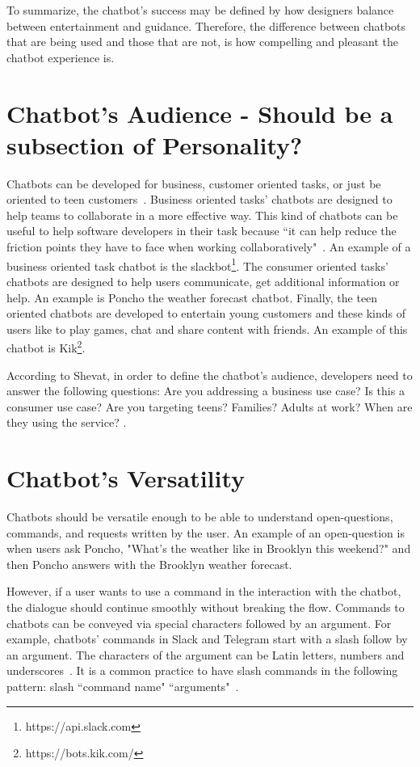 \documentclass[a4paper,10pt]{article}
\begin{document}
To summarize, the chatbot’s success may be defined by how designers balance between entertainment and guidance. Therefore, the difference between chatbots that are being used and those that are not, is how compelling and pleasant the chatbot experience is.

\section{Chatbot's Audience - Should be a subsection of Personality?}

Chatbots can be developed for business, customer oriented tasks, or just be oriented to teen customers~\cite{Shevat2017}. Business oriented tasks' chatbots are designed to help teams to collaborate in a more effective way. This kind of chatbots can be useful to help software developers in their task because ``it can help reduce the friction points they have to face when working collaboratively"~\cite{lebeuf2017software}. An example of a business oriented task chatbot is the slackbot\footnote{https://api.slack.com}. The consumer oriented tasks' chatbots are designed to help users communicate, get additional information or help. An example is Poncho the weather forecast chatbot. Finally, the teen oriented chatbots are developed to entertain young customers and these kinds of users like to play games, chat and share content with friends. An example of this chatbot is Kik\footnote{https://bots.kik.com/}. 

According to Shevat, in order to define the chatbot's audience, developers need to answer the following questions: Are you addressing a business use case? Is this a consumer use case? Are you targeting teens? Families? Adults at work? When are they using the service? \cite{Shevat2017}.

\section{Chatbot's Versatility}
Chatbots should be versatile enough to be able to understand open-questions, commands, and requests written by the user. An example of an open-question is when users ask Poncho, "What's the weather like in Brooklyn this weekend?" and then Poncho answers with the Brooklyn weather forecast. 

However, if a user wants to use a command in the interaction with the chatbot, the dialogue should continue smoothly without breaking the flow. Commands to chatbots can be conveyed via special characters followed by an argument. For example, chatbots' commands in Slack and Telegram start with a slash follow by an argument. The characters of the argument can be Latin letters, numbers and underscores~\cite{botfather}. It is a common practice to have slash commands in the following pattern: slash ``command name" ``arguments"~\cite{Shevat2017}.  
\end{document}
